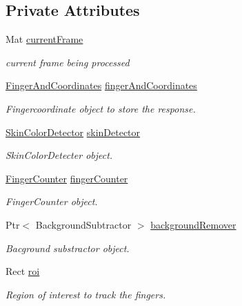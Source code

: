 \subsection*{Private Attributes}
\begin{DoxyCompactItemize}
\item 
Mat \hyperlink{class_gestro_1_1_capture_and_detect_ab7694fb9dc10f0819f0c59feb123087a}{current\+Frame}
\begin{DoxyCompactList}\small\item\em current frame being processed \end{DoxyCompactList}\item 
\hyperlink{class_gesture_detection_1_1_finger_and_coordinates}{Finger\+And\+Coordinates} \hyperlink{class_gestro_1_1_capture_and_detect_a0eaec358c409bd96ec89bd86c0f4049b}{finger\+And\+Coordinates}
\begin{DoxyCompactList}\small\item\em Fingercoordinate object to store the response. \end{DoxyCompactList}\item 
\hyperlink{class_gesture_detection_1_1_skin_color_detector}{Skin\+Color\+Detector} \hyperlink{class_gestro_1_1_capture_and_detect_a179ec3c7d8c145f5cbe53d72b64fa656}{skin\+Detector}
\begin{DoxyCompactList}\small\item\em Skin\+Color\+Detecter object. \end{DoxyCompactList}\item 
\hyperlink{class_gesture_detection_1_1_finger_counter}{Finger\+Counter} \hyperlink{class_gestro_1_1_capture_and_detect_a06e92344901d2060142711bb9a2368b9}{finger\+Counter}
\begin{DoxyCompactList}\small\item\em Finger\+Counter object. \end{DoxyCompactList}\item 
Ptr$<$ Background\+Subtractor $>$ \hyperlink{class_gestro_1_1_capture_and_detect_a83873f62b771ca924cf39ee7e8e8eb80}{background\+Remover}
\begin{DoxyCompactList}\small\item\em Bacground substractor object. \end{DoxyCompactList}\item 
Rect \hyperlink{class_gestro_1_1_capture_and_detect_a957cb7ba12d74145492f613fe40c2b10}{roi}
\begin{DoxyCompactList}\small\item\em Region of interest to track the fingers. \end{DoxyCompactList}\item 

\end{DoxyCompactItemize}
